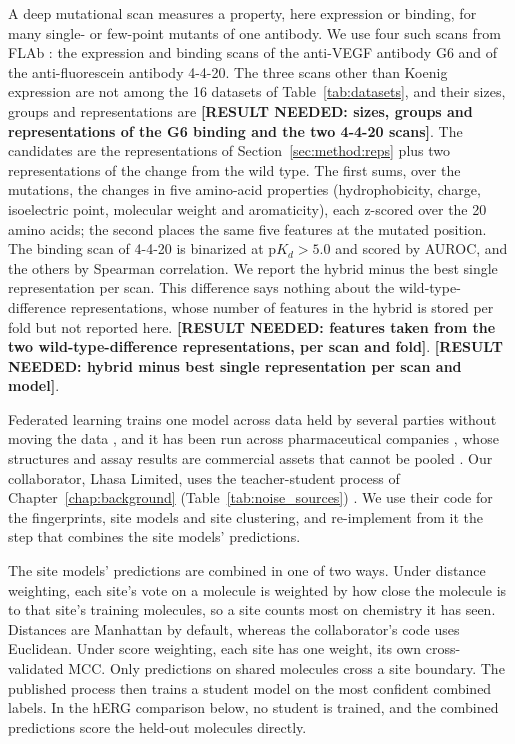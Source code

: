 A deep mutational scan measures a property, here expression or binding, for many single- or few-point mutants of one antibody. We use four such scans from FLAb \citep{Chungyoun2024}: the expression and binding scans of the anti-VEGF antibody G6 \citep{Koenig2017} and of the anti-fluorescein antibody 4-4-20. The three scans other than Koenig expression are not among the 16 datasets of Table~\ref{tab:datasets}, and their sizes, groups and representations are \textbf{[RESULT NEEDED: sizes, groups and representations of the G6 binding and the two 4-4-20 scans]}. The candidates are the representations of Section~\ref{sec:method:reps} plus two representations of the change from the wild type. The first sums, over the mutations, the changes in five amino-acid properties (hydrophobicity, charge, isoelectric point, molecular weight and aromaticity), each z-scored over the 20 amino acids; the second places the same five features at the mutated position. The binding scan of 4-4-20 is binarized at $\mathrm{p}K_d > 5.0$ and scored by AUROC, and the others by Spearman correlation. We report the hybrid minus the best single representation per scan. This difference says nothing about the wild-type-difference representations, whose number of features in the hybrid is stored per fold but not reported here. \textbf{[RESULT NEEDED: features taken from the two wild-type-difference representations, per scan and fold]}. \textbf{[RESULT NEEDED: hybrid minus best single representation per scan and model]}.

Federated learning trains one model across data held by several parties without moving the data \citep{McMahan2017}, and it has been run across pharmaceutical companies \citep{Heyndrickx2024}, whose structures and assay results are commercial assets that cannot be pooled \citep{Hanser2023,Bassani2023}. Our collaborator, Lhasa Limited, uses the teacher-student process of Chapter~\ref{chap:background} (Table~\ref{tab:noise_sources}) \citep{Hanser2025}. We use their code for the fingerprints, site models and site clustering, and re-implement from it the step that combines the site models' predictions.

The site models' predictions are combined in one of two ways. Under distance weighting, each site's vote on a molecule is weighted by how close the molecule is to that site's training molecules, so a site counts most on chemistry it has seen. Distances are Manhattan by default, whereas the collaborator's code uses Euclidean. Under score weighting, each site has one weight, its own cross-validated MCC. Only predictions on shared molecules cross a site boundary. The published process then trains a student model on the most confident combined labels. In the hERG comparison below, no student is trained, and the combined predictions score the held-out molecules directly.

